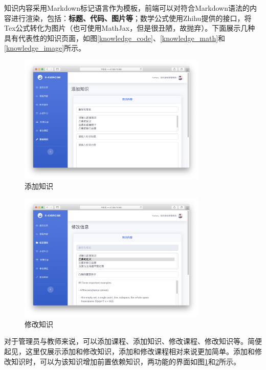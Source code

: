\documentclass{nwafucoursepaper}
\begin{document}
知识内容采用Markdown标记语言作为模板，前端可以对符合Markdown语法的内容进行渲染，包括：\textbf{标题、代码、图片等}；数学公式使用Zhihu提供的接口，将Tex公式转化为图片（也可使用MathJax，但是很丑陋，故抛弃）。下面展示几种具有代表性的知识页面，如图\ref{knowledge_code}、\ref{knowledge_math}和\ref{knowledge_image}所示。

\begin{figure}[htp]
  \centering
  \includegraphics[width=0.8\textwidth]{add_knowledge.png}
  \caption{添加知识}
  \label{add_knowledge}
\end{figure}

\begin{figure}[htp]
  \centering
  \includegraphics[width=0.8\textwidth]{modify_knowledge.png}
  \caption{修改知识}
  \label{modify_knowledge}
\end{figure}

对于管理员与教师来说，可以添加课程、添加知识、修改课程、修改知识等。简便起见，这里仅展示添加和修改知识，添加和修改课程相对来说更加简单。添加和修改知识时，可以为该知识增加前置依赖知识，两功能的界面如图\ref{add_knowledge}和\ref{modify_knowledge}所示。
\end{document}
